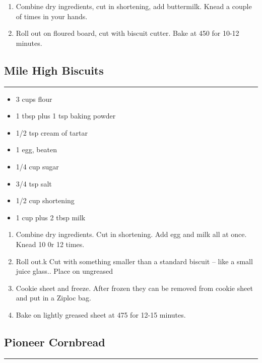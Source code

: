 \documentclass{article}
\begin{document}
\begin{enumerate}
    \item
        Combine dry ingredients, cut in shortening, add buttermilk.  Knead a couple of times in your hands.
    \item
        Roll out on floured board, cut with biscuit cutter. Bake at 450 for 10-12 minutes.
\end{enumerate}
\newpage

\subsection{Mile High Biscuits} 
\noindent\rule[0.5ex]{\linewidth}{1pt}

\begin{framed}
\begin{itemize}
    \item 3 cups flour
    \item 1 tbsp plus 1 tsp baking powder
    \item 1/2 tsp cream of tartar
    \item 1 egg, beaten 
    \item 1/4 cup sugar
    \item 3/4 tsp salt
    \item 1/2 cup shortening
    \item 1 cup plus 2 tbsp milk
\end{itemize}
\end{framed}

\begin{enumerate}
    \item
        Combine dry ingredients. Cut in shortening. Add egg and milk all at once. Knead 10 0r 12 times.
    \item
        Roll out.k Cut with something smaller than a standard biscuit – like a small juice glass.. Place on ungreased
    \item
        Cookie sheet and freeze. After frozen they can be removed from cookie sheet and put in a Ziploc bag.
    \item
        Bake on lightly greased sheet at 475 for 12-15 minutes.
\end{enumerate}
\newpage

\subsection{Pioneer Cornbread} 
\noindent\rule[0.5ex]{\linewidth}{1pt}
\end{document}
